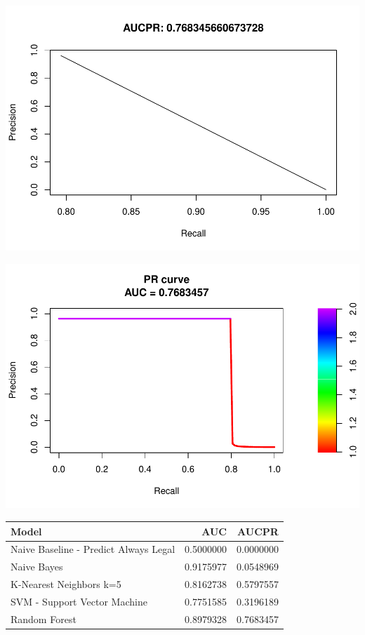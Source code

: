 \documentclass[]{article}
\begin{document}
\begin{center}\includegraphics{Credit_Card_Fraud_Detection_Project_Report_files/figure-latex/unnamed-chunk-20-2} \end{center}

\begin{center}\includegraphics{Credit_Card_Fraud_Detection_Project_Report_files/figure-latex/unnamed-chunk-20-3} \end{center}

\begin{table}[H]
\centering\begingroup\fontsize{10}{12}\selectfont

\begin{tabular}{l|r|r}
\hline
Model & AUC & AUCPR\\
\hline
Naive Baseline - Predict Always Legal & 0.5000000 & 0.0000000\\
\hline
Naive Bayes & 0.9175977 & 0.0548969\\
\hline
K-Nearest Neighbors k=5 & 0.8162738 & 0.5797557\\
\hline
SVM - Support Vector Machine & 0.7751585 & 0.3196189\\
\hline
Random Forest & 0.8979328 & 0.7683457\\
\hline
\end{tabular}
\endgroup{}
\end{table}
\end{document}
